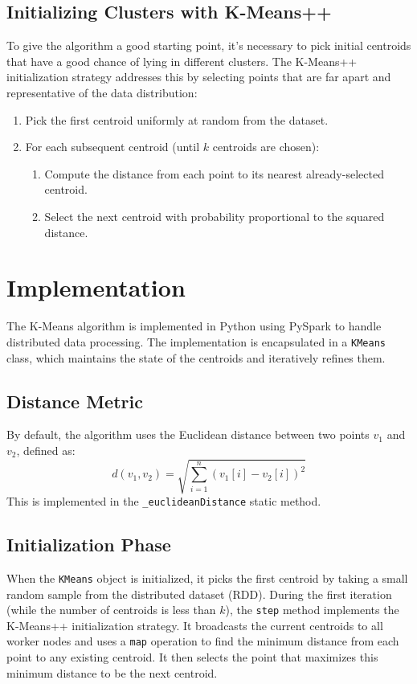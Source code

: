 \documentclass{report}
\begin{document}
\subsection{Initializing Clusters with K-Means++}
To give the algorithm a good starting point, it's necessary to pick initial centroids that have a good chance of lying in different clusters. The K-Means++ initialization strategy addresses this by selecting points that are far apart and representative of the data distribution:
\begin{enumerate}
    \item Pick the first centroid uniformly at random from the dataset.
    \item For each subsequent centroid (until $k$ centroids are chosen):
    \begin{enumerate}
        \item Compute the distance from each point to its nearest already-selected centroid.
        \item Select the next centroid with probability proportional to the squared distance.
    \end{enumerate}
\end{enumerate}

\section{Implementation}
The K-Means algorithm is implemented in Python using PySpark to handle distributed data processing. The implementation is encapsulated in a \texttt{KMeans} class, which maintains the state of the centroids and iteratively refines them.

\subsection{Distance Metric}
By default, the algorithm uses the Euclidean distance between two points $v_1$ and $v_2$, defined as:
$$ d(v_1, v_2) = \sqrt{\sum_{i=1}^{n} (v_1[i] - v_2[i])^2} $$
This is implemented in the \texttt{\_euclideanDistance} static method.

\subsection{Initialization Phase}
When the \texttt{KMeans} object is initialized, it picks the first centroid by taking a small random sample from the distributed dataset (RDD). 
During the first iteration (while the number of centroids is less than $k$), the \verb|step| method implements the K-Means++ initialization strategy. It broadcasts the current centroids to all worker nodes and uses a \verb|map| operation to find the minimum distance from each point to any existing centroid. It then selects the point that maximizes this minimum distance to be the next centroid.
\end{document}
